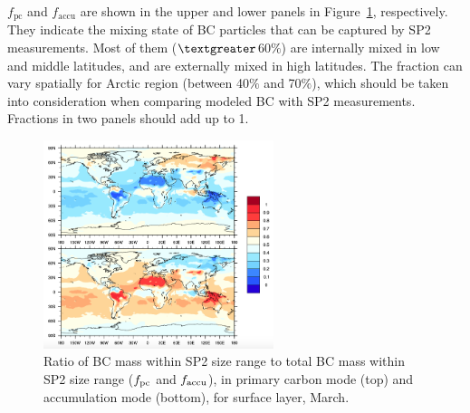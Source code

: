 \documentclass[11pt]{article}
\begin{document}
$f_{\text{pc}}$ and $f_{\text{accu}}$ are shown in the upper
and lower panels in Figure~\ref{fig_P3}, respectively. They indicate the mixing state of BC particles
that can be captured by SP2 measurements. Most of them
($\textgreater$60$\%$) are internally mixed in low and middle
latitudes, and are externally mixed in high latitudes. The fraction
can vary spatially for Arctic region (between 40$\%$ and 70$\%$),
which should be taken into consideration when comparing modeled BC
with SP2 measurements. Fractions in two panels should add up to 1.


\begin{figure}[!h] 
	\begin{center}
		\includegraphics[width = 0.6\textwidth]{Rplot03}
		\caption[]{\label{fig_P3} Ratio of BC mass within SP2 size range to total BC mass within SP2 size range ($f_{\rm pc}$ and $f_{\rm accu}$), in primary carbon mode (top) and accumulation mode (bottom), for surface layer, March.}
	\end{center}
\end{figure}





\clearpage









\end{document}
